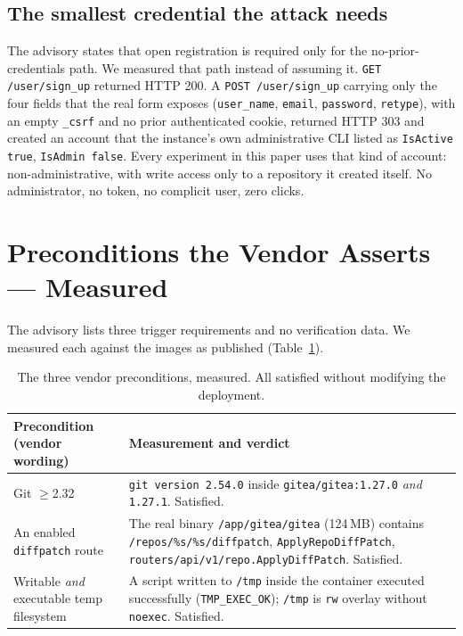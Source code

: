 \subsection{The smallest credential the attack needs}
\label{sec:precond-cred}

The advisory states that open registration is required only for the
no-prior-credentials path. We measured that path instead of assuming it.
\texttt{GET /user/sign\_up} returned HTTP 200. A \texttt{POST /user/sign\_up}
carrying only the four fields that the real form exposes (\texttt{user\_name},
\texttt{email}, \texttt{password}, \texttt{retype}), with an empty
\texttt{\_csrf} and no prior authenticated cookie, returned HTTP 303 and created
an account that the instance's own administrative CLI listed as
\texttt{IsActive true}, \texttt{IsAdmin false}. Every experiment in this paper
uses that kind of account: non-administrative, with write access only to a
repository it created itself. No administrator, no token, no complicit user,
zero clicks.

\section{Preconditions the Vendor Asserts --- Measured}
\label{sec:precond}

The advisory lists three trigger requirements and no verification data. We
measured each against the images as published (Table~\ref{tab:precond}).

\begin{table}[t]
\centering
\footnotesize
\begin{tabular}{@{}p{2.2cm}p{5.4cm}@{}}
\toprule
Precondition (vendor wording) & Measurement and verdict \\
\midrule
Git $\geq$2.32 & \texttt{git version 2.54.0} inside \texttt{gitea/gitea:1.27.0}
\emph{and} \texttt{1.27.1}. Satisfied. \\
An enabled \texttt{diffpatch} route & The real binary
\texttt{/app/gitea/gitea} (124\,MB) contains
\texttt{/repos/\%s/\%s/diffpatch}, \texttt{ApplyRepoDiffPatch},
\texttt{routers/\allowbreak api/\allowbreak v1/\allowbreak repo.\allowbreak ApplyDiffPatch}. Satisfied. \\
Writable \emph{and} executable temp filesystem & A script written to
\texttt{/tmp} inside the container executed successfully
(\texttt{TMP\_EXEC\_OK}); \texttt{/tmp} is \texttt{rw} overlay without
\texttt{noexec}. Satisfied. \\
\bottomrule
\end{tabular}
\caption{The three vendor preconditions, measured. All satisfied without
modifying the deployment.}
\label{tab:precond}
\end{table}

